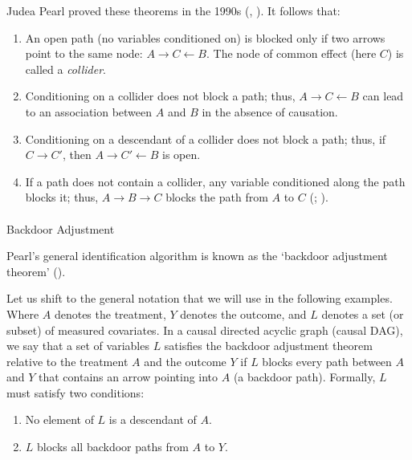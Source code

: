 \documentclass[
  single column]{article}
\makeatletter
\let\oldparagraph\paragraph
\renewcommand{\paragraph}{
    \@ifstar
      \xxxParagraphStar
      \xxxParagraphNoStar
  }
\newcommand{\xxxParagraphStar}[1]{\oldparagraph*{#1}\mbox{}}
\newcommand{\xxxParagraphNoStar}[1]{\oldparagraph{#1}\mbox{}}
\providecommand{\tightlist}{%
  \setlength{\itemsep}{0pt}\setlength{\parskip}{0pt}}\usepackage{longtable,booktabs,array}
\makeatother
\begin{document}
Judea Pearl proved these theorems in the 1990s
(, ).
It follows that:

\begin{enumerate}
\def\labelenumi{\arabic{enumi}.}
\tightlist
\item
  An open path (no variables conditioned on) is blocked only if two
  arrows point to the same node: \(A \rightarrow C \leftarrow B\). The
  node of common effect (here \(C\)) is called a \emph{collider}.
\item
  Conditioning on a collider does not block a path; thus,
  \(A \rightarrow \boxed{C} \leftarrow B\) can lead to an association
  between \(A\) and \(B\) in the absence of causation.
\item
  Conditioning on a descendant of a collider does not block a path;
  thus, if \(C \rightarrow \boxed{C'}\), then
  \(A \rightarrow \boxed{C'} \leftarrow B\) is open.
\item
  If a path does not contain a collider, any variable conditioned along
  the path blocks it; thus, \(A \rightarrow \boxed{B} \rightarrow C\)
  blocks the path from \(A\) to \(C\) (; ).
\end{enumerate}

\paragraph{Backdoor Adjustment}\label{backdoor-adjustment}

Pearl's general identification algorithm is known as the `backdoor
adjustment theorem' ().

Let us shift to the general notation that we will use in the following
examples. Where \(A\) denotes the treatment, \(Y\) denotes the outcome,
and \(L\) denotes a set (or subset) of measured covariates. In a causal
directed acyclic graph (causal DAG), we say that a set of variables
\(L\) satisfies the backdoor adjustment theorem relative to the
treatment \(A\) and the outcome \(Y\) if \(L\) blocks every path between
\(A\) and \(Y\) that contains an arrow pointing into \(A\) (a backdoor
path). Formally, \(L\) must satisfy two conditions:

\begin{enumerate}
\def\labelenumi{\arabic{enumi}.}
\tightlist
\item
  No element of \(L\) is a descendant of \(A\).
\item
  \(L\) blocks all backdoor paths from \(A\) to \(Y\).
\end{enumerate}
\end{document}
